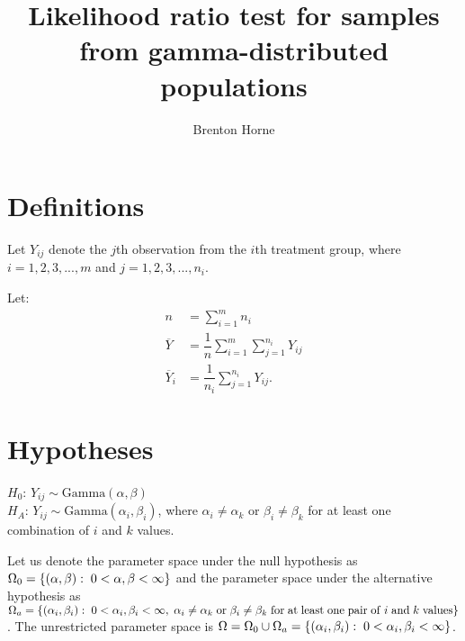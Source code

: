 \documentclass[12pt,a4paper]{article}
\title{Likelihood ratio test for samples from gamma-distributed populations}
\author{Brenton Horne}
\newcommand{\GamD}{\mathrm{Gamma}}
\begin{document}
	\maketitle
	\tableofcontents
	\newpage
	
	\section{Definitions}
	Let $Y_{ij}$ denote the $j$th observation from the $i$th treatment group, where $i=1, 2, 3, ..., m$ and $j=1, 2, 3, ..., n_i$. 
	
	Let:
	\begin{align*}
		n &= \sum_{i=1}^m n_i \\
		\overline{Y} &= \dfrac{1}{n} \sum_{i=1}^m \sum_{j=1}^{n_i} Y_{ij} \\
		\overline{Y}_i &= \dfrac{1}{n_i} \sum_{j=1}^{n_i} Y_{ij}.
	\end{align*}
	
	\section{Hypotheses}
	$H_0$: $Y_{ij} \sim \GamD(\alpha, \beta)$ \\
	$H_A$: $Y_{ij} \sim \GamD(\alpha_i, \beta_i)$, where $\alpha_i \neq \alpha_k$ or $\beta_i \neq \beta_k$ for at least one combination of $i$ and $k$ values. 
	
	Let us denote the parameter space under the null hypothesis as $\Omega_0 = \left\{(\alpha, \beta): \hspace{0.1cm} 0 < \alpha, \beta < \infty\right\}$ and the parameter space under the alternative hypothesis as \\$\Omega_a = \left\{(\alpha_i, \beta_i): \hspace{0.1cm} 0 < \alpha_i, \beta_i < \infty,\hspace{0.1cm}\alpha_i \neq \alpha_k \hspace{0.1cm} \mathrm{or}\hspace{0.1cm}\beta_i \neq \beta_k \hspace{0.1cm}\mathrm{for}\hspace{0.1cm}\mathrm{at}\hspace{0.1cm}\mathrm{least}\hspace{0.1cm}\mathrm{one}\hspace{0.1cm}\mathrm{pair}\hspace{0.1cm}\mathrm{of}\hspace{0.1cm}i\hspace{0.1cm}\mathrm{and}\hspace{0.1cm}k \hspace{0.1cm}\mathrm{values}\right\}$. The unrestricted parameter space is $\Omega = \Omega_0 \cup \Omega_a = \left\{(\alpha_i, \beta_i): \hspace{0.1cm} 0 < \alpha_i, \beta_i < \infty\right\}$. 
	
\end{document}
